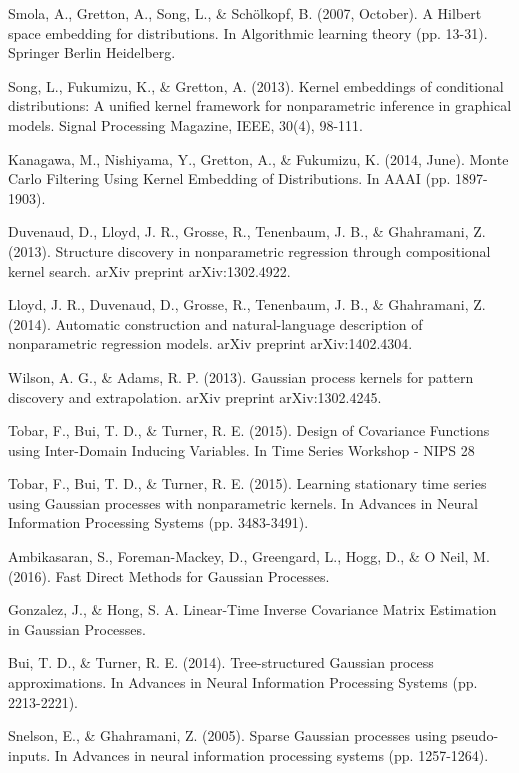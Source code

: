 \begin{thebibliography}{99}
 Smola, A., Gretton, A., Song, L., \& Sch\"{o}lkopf, B. (2007,
October). A Hilbert space embedding for distributions. In Algorithmic
learning theory (pp. 13-31). Springer Berlin Heidelberg.

 Song, L., Fukumizu, K., \& Gretton, A. (2013). Kernel
embeddings of conditional distributions: A unified kernel framework for
nonparametric inference in graphical models. Signal Processing Magazine,
IEEE, 30(4), 98-111.

 Kanagawa, M., Nishiyama, Y., Gretton, A., \& Fukumizu, K.
(2014, June). Monte Carlo Filtering Using Kernel Embedding of Distributions.
In AAAI (pp. 1897-1903).

 Duvenaud, D., Lloyd, J. R., Grosse, R., Tenenbaum, J. B., \&
Ghahramani, Z. (2013). Structure discovery in nonparametric regression
through compositional kernel search. arXiv preprint arXiv:1302.4922.

 Lloyd, J. R., Duvenaud, D., Grosse, R., Tenenbaum, J. B., \&
Ghahramani, Z. (2014). Automatic construction and natural-language
description of nonparametric regression models. arXiv preprint
arXiv:1402.4304.

 Wilson, A. G., \& Adams, R. P. (2013). Gaussian process kernels
for pattern discovery and extrapolation. arXiv preprint arXiv:1302.4245.

 Tobar, F., Bui, T. D., \& Turner, R. E. (2015). Design of
Covariance Functions using Inter-Domain Inducing Variables. In Time Series
Workshop - NIPS 28

 Tobar, F., Bui, T. D., \& Turner, R. E. (2015). Learning
stationary time series using Gaussian processes with nonparametric kernels.
In Advances in Neural Information Processing Systems (pp. 3483-3491).

 Ambikasaran, S., Foreman-Mackey, D., Greengard, L., Hogg, D.,
\& O Neil, M. (2016). Fast Direct Methods for Gaussian Processes.

 Gonzalez, J., \& Hong, S. A. Linear-Time Inverse Covariance
Matrix Estimation in Gaussian Processes.

 Bui, T. D., \& Turner, R. E. (2014). Tree-structured Gaussian
process approximations. In Advances in Neural Information Processing Systems
(pp. 2213-2221).

 Snelson, E., \& Ghahramani, Z. (2005). Sparse Gaussian
processes using pseudo-inputs. In Advances in neural information processing
systems (pp. 1257-1264).


\end{thebibliography}
